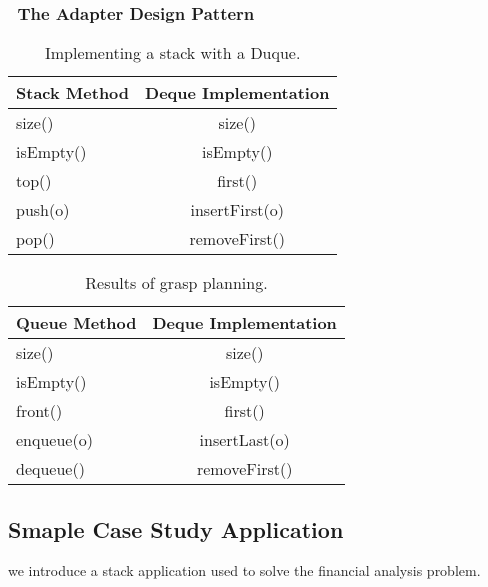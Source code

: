 \documentclass[twocolumn,10pt]{jarticle}
\begin{document}
\subsubsection{\ The Adapter Design Pattern}
\begin{table}[H]
\caption{Implementing a stack with a Duque.}
\centering
\vspace{4mm}
  \begin{tabular}{|l|c|} \hline
    Stack Method & Deque Implementation \\ \hline \hline
    size() & size()   \\
    isEmpty() & isEmpty()  \\
    top() & first()  \\ 
    push(o) & insertFirst(o) \\
    pop() & removeFirst()  \\    \hline
  \end{tabular}
\label{tb:gyudon}
\end{table}
\begin{table}[H]
\caption{Results of grasp planning.}
\centering
\vspace{4mm}
  \begin{tabular}{|l|c|} \hline
    Queue Method & Deque Implementation \\ \hline \hline
    size() & size()   \\
    isEmpty() & isEmpty()  \\
    front() & first()  \\ 
    enqueue(o) & insertLast(o) \\
    dequeue() & removeFirst()  \\    \hline
  \end{tabular}
\label{tb:gyudon}
\end{table}
\setcounter{section}{4}
\setcounter{subsection}{5}
\subsection{ Smaple Case Study Application}
we introduce a stack application used to solve the financial analysis problem. 
\end{document}
